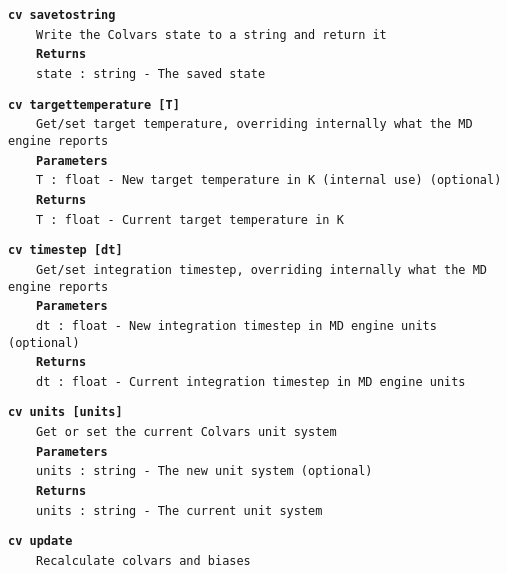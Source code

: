 \begin{mdexampleinput}{}
\texttt{\textbf{cv savetostring}}
\\
\-~~~~\texttt{Write the Colvars state to a string and return it}
\\
\-~~~~\texttt{\textbf{Returns}}
\\
\-~~~~\texttt{state : string - The saved state}
\end{mdexampleinput}
\begin{mdexampleinput}{}
\texttt{\textbf{cv targettemperature [T]}}
\\
\-~~~~\texttt{Get/set target temperature, overriding internally what the MD engine reports}
\\
\-~~~~\texttt{\textbf{Parameters}}
\\
\-~~~~\texttt{T : float - New target temperature in K (internal use) (optional)}
\\
\-~~~~\texttt{\textbf{Returns}}
\\
\-~~~~\texttt{T : float - Current target temperature in K}
\end{mdexampleinput}
\begin{mdexampleinput}{}
\texttt{\textbf{cv timestep [dt]}}
\\
\-~~~~\texttt{Get/set integration timestep, overriding internally what the MD engine reports}
\\
\-~~~~\texttt{\textbf{Parameters}}
\\
\-~~~~\texttt{dt : float - New integration timestep in MD engine units (optional)}
\\
\-~~~~\texttt{\textbf{Returns}}
\\
\-~~~~\texttt{dt : float - Current integration timestep in MD engine units}
\end{mdexampleinput}
\begin{mdexampleinput}{}
\texttt{\textbf{cv units [units]}}
\\
\-~~~~\texttt{Get or set the current Colvars unit system}
\\
\-~~~~\texttt{\textbf{Parameters}}
\\
\-~~~~\texttt{units : string - The new unit system (optional)}
\\
\-~~~~\texttt{\textbf{Returns}}
\\
\-~~~~\texttt{units : string - The current unit system}
\end{mdexampleinput}
\begin{mdexampleinput}{}
\texttt{\textbf{cv update}}
\\
\-~~~~\texttt{Recalculate colvars and biases}
\end{mdexampleinput}
